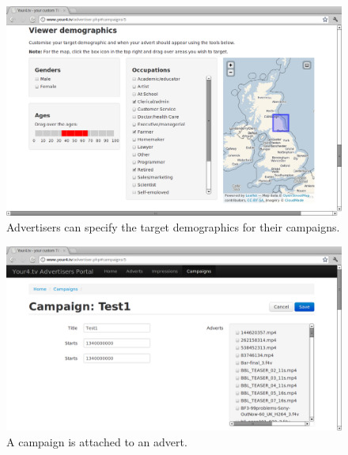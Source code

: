 \begin{figure}[th]
	\centering
	\includegraphics[width=\textwidth,height=0.5\textheight,keepaspectratio]{images/screenshots/advertiser-campaign-demographics.png}
	\caption{Advertisers can specify the target demographics for their campaigns.}
	\label{fig:advertiser-campaign-demographics}
\end{figure}
\begin{figure}[th]
	\centering
	\includegraphics[width=\textwidth,height=0.5\textheight,keepaspectratio]{images/screenshots/advertiser-campaign.png}
	\caption{A campaign is attached to an advert.}
	\label{fig:advertiser-campaign}
\end{figure}
